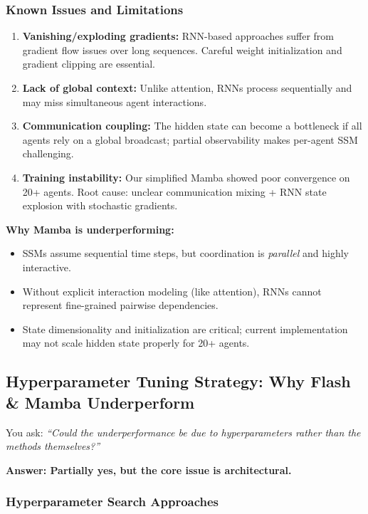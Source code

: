\subsubsection{Known Issues and Limitations}

\begin{enumerate}
    \item \textbf{Vanishing/exploding gradients:} RNN-based approaches suffer from gradient flow issues over long sequences. Careful weight initialization and gradient clipping are essential.
    \item \textbf{Lack of global context:} Unlike attention, RNNs process sequentially and may miss simultaneous agent interactions.
    \item \textbf{Communication coupling:} The hidden state can become a bottleneck if all agents rely on a global broadcast; partial observability makes per-agent SSM challenging.
    \item \textbf{Training instability:} Our simplified Mamba showed poor convergence on 20+ agents. Root cause: unclear communication mixing + RNN state explosion with stochastic gradients.
\end{enumerate}

\textbf{Why Mamba is underperforming:}
\begin{itemize}
    \item SSMs assume sequential time steps, but coordination is \emph{parallel} and highly interactive.
    \item Without explicit interaction modeling (like attention), RNNs cannot represent fine-grained pairwise dependencies.
    \item State dimensionality and initialization are critical; current implementation may not scale hidden state properly for 20+ agents.
\end{itemize}


\subsection{Hyperparameter Tuning Strategy: Why Flash \& Mamba Underperform}
\label{subsec:hyperparam}

You ask: \textit{``Could the underperformance be due to hyperparameters rather than the methods themselves?''}

\textbf{Answer: Partially yes, but the core issue is architectural.}

\subsubsection{Hyperparameter Search Approaches}

